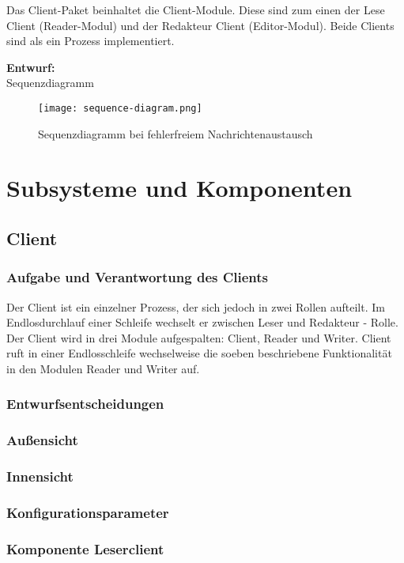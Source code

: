 \documentclass{article}
\begin{document}
	Das Client-Paket beinhaltet die Client-Module. Diese sind zum einen der Lese Client (Reader-Modul) und der Redakteur
	Client (Editor-Modul). Beide Clients sind als ein Prozess implementiert.
	
	\textbf{Entwurf:}\\
Sequenzdiagramm
\begin{figure}[H]
\centering
	\texttt{[image: sequence-diagram.png]}
\caption[seq-dia]{Sequenzdiagramm bei fehlerfreiem Nachrichtenaustausch}
\label{fig:sequence-diagram}
\end{figure}


\section{Subsysteme und Komponenten}
	\subsection{Client}
		\subsubsection{Aufgabe und Verantwortung des Clients}
			Der Client ist ein einzelner Prozess, der sich jedoch in zwei Rollen aufteilt. 
			Im Endlosdurchlauf einer Schleife wechselt er zwischen 
			Leser und Redakteur - Rolle.
        		\newline
			Der Client wird in drei Module aufgespalten: Client, Reader und Writer. 
			Client ruft in einer Endlosschleife wechselweise die soeben beschriebene 
			Funktionalität in den Modulen Reader und Writer auf.
		\subsubsection{Entwurfsentscheidungen}
		\subsubsection{Außensicht}
		\subsubsection{Innensicht}
		\subsubsection{Konfigurationsparameter}
    	\subsubsection{Komponente Leserclient}
    	
\end{document}
